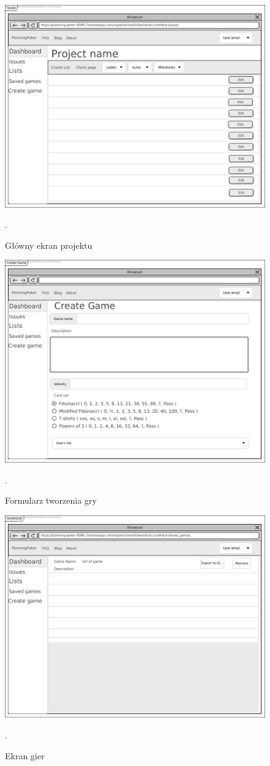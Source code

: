 \begin{figure}[H]
	\centering\includegraphics[width=.7\textwidth]{img/IssuesScreen}
	\caption{Główny ekran projektu}.
	\label{rys:IssuesScreen}
\end{figure}
\begin{figure}[H]
	\centering\includegraphics[width=.7\textwidth]{img/gameCreate}
	\caption{Formularz tworzenia gry}.
	\label{rys:gameCreate}
\end{figure}
\begin{figure}[H]
	\centering\includegraphics[width=.7\textwidth]{img/GamesList}
	\caption{Ekran gier}.
	\label{rys:GamesList}
\end{figure}
